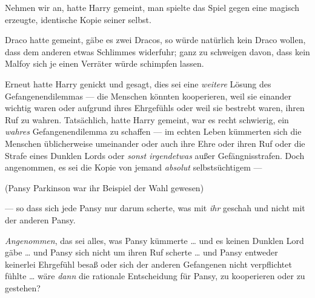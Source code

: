 Nehmen wir an, hatte Harry gemeint, man spielte das Spiel gegen eine magisch erzeugte, identische Kopie seiner selbst.

Draco hatte gemeint, gäbe es zwei Dracos, so würde natürlich kein Draco wollen, dass dem anderen etwas Schlimmes widerfuhr; ganz zu schweigen davon, dass kein Malfoy sich je einen Verräter würde schimpfen lassen.

Erneut hatte Harry genickt und gesagt, dies sei eine \emph{weitere} Lösung des Gefangenendilemmas — die Menschen könnten kooperieren, weil sie einander wichtig waren oder aufgrund ihres Ehrgefühls oder weil sie bestrebt waren, ihren Ruf zu wahren. Tatsächlich, hatte Harry gemeint, war es recht schwierig, ein \emph{wahres} Gefangenendilemma zu schaffen — im echten Leben kümmerten sich die Menschen üblicherweise umeinander oder auch ihre Ehre oder ihren Ruf oder die Strafe eines Dunklen Lords oder \emph{sonst irgendetwas} außer Gefängnisstrafen. Doch angenommen, es sei die Kopie von jemand \emph{absolut} selbstsüchtigem —

(Pansy Parkinson war ihr Beispiel der Wahl gewesen)

— so dass sich jede Pansy nur darum scherte, was mit \emph{ihr} geschah und nicht mit der anderen Pansy.

\emph{Angenommen}, das sei alles, was Pansy kümmerte … und es keinen Dunklen Lord gäbe … und Pansy sich nicht um ihren Ruf scherte … und Pansy entweder keinerlei Ehrgefühl besaß oder sich der anderen Gefangenen nicht verpflichtet fühlte … wäre \emph{dann} die rationale Entscheidung für Pansy, zu kooperieren oder zu gestehen?

